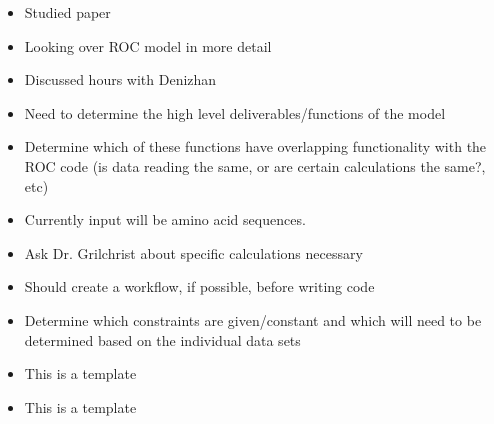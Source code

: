 \documentclass[12pt,hyperref]{labbook}
\begin{document}
\begin{itemize}
  \item Studied paper
  \item Looking over ROC model in more detail
  \item Discussed hours with Denizhan 
\end{itemize}
\begin{itemize}
  \item Need to determine the high level deliverables/functions of the model
  \item Determine which of these functions have overlapping functionality with
the ROC code (is data reading the same, or are certain calculations the same?, etc)
  \item Currently input will be amino acid sequences. 
  \item Ask Dr. Grilchrist about specific calculations necessary
  \item Should create a workflow, if possible, before writing code
  \item Determine which constraints are given/constant and which will need to
be determined based on the individual data sets
\end{itemize}


\begin{itemize}
  \item This is a template
\end{itemize}
\begin{itemize}
  \item This is a template
\end{itemize}


 
\end{document}

